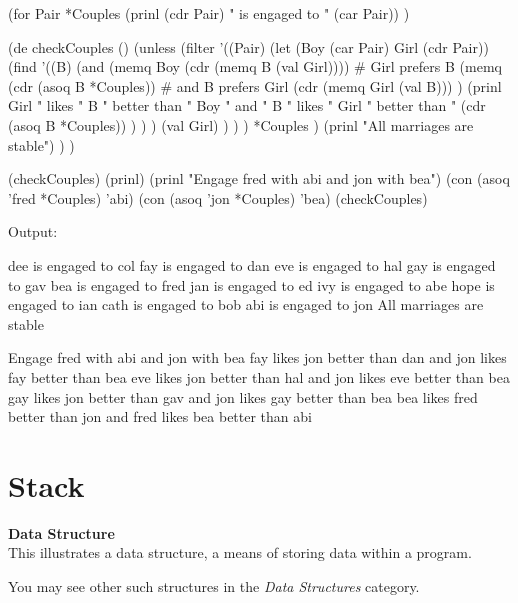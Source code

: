 \begin{itemize}
\begin{wideverbatim}
(for Pair *Couples
   (prinl (cdr Pair) " is engaged to " (car Pair)) )

\end{wideverbatim}

\begin{wideverbatim}


(de checkCouples ()
   (unless
      (filter
         '((Pair)
            (let (Boy (car Pair)  Girl (cdr Pair))
               (find
                  '((B)
                     (and
                        (memq Boy (cdr (memq B (val Girl))))  # Girl prefers B
                        (memq
                           (cdr (asoq B *Couples))            # and B prefers Girl
                           (cdr (memq Girl (val B))) )
                        (prinl
                           Girl " likes " B " better than " Boy " and "
                           B " likes " Girl " better than "
                           (cdr (asoq B *Couples)) ) ) )
                  (val Girl) ) ) )
         *Couples )
      (prinl "All marriages are stable") ) )

(checkCouples)
(prinl)
(prinl "Engage fred with abi and jon with bea")
(con (asoq 'fred *Couples) 'abi)
(con (asoq 'jon *Couples) 'bea)
(checkCouples)

Output:

dee is engaged to col
fay is engaged to dan
eve is engaged to hal
gay is engaged to gav
bea is engaged to fred
jan is engaged to ed
ivy is engaged to abe
hope is engaged to ian
cath is engaged to bob
abi is engaged to jon
All marriages are stable

Engage fred with abi and jon with bea
fay likes jon better than dan and jon likes fay better than bea
eve likes jon better than hal and jon likes eve better than bea
gay likes jon better than gav and jon likes gay better than bea
bea likes fred better than jon and fred likes bea better than abi

\end{wideverbatim}

\pagebreak{}
\section*{Stack}

\textbf{Data Structure}\\ This illustrates a data structure, a means of
storing data within a program.

You may see other such structures in the
\emph{Data Structures} category.


\end{itemize}
